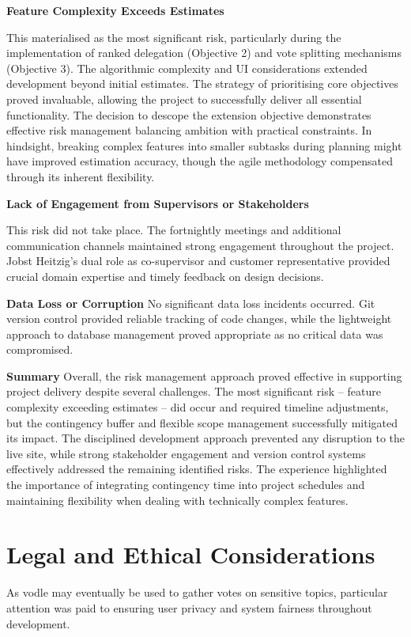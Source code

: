 \textbf{Feature Complexity Exceeds Estimates}

This materialised as the most significant risk, particularly during the implementation of ranked delegation (Objective 2) and vote splitting mechanisms (Objective 3). The algorithmic complexity and UI considerations extended development beyond initial estimates.
The strategy of prioritising core objectives proved invaluable, allowing the project to successfully deliver all essential functionality. The decision to descope the extension objective demonstrates effective risk management balancing ambition with practical constraints.
In hindsight, breaking complex features into smaller subtasks during planning might have improved estimation accuracy, though the agile methodology compensated through its inherent flexibility.

\textbf{Lack of Engagement from Supervisors or Stakeholders}

This risk did not take place. The fortnightly meetings and additional communication channels maintained strong engagement throughout the project. Jobst Heitzig's dual role as co-supervisor and customer representative provided crucial domain expertise and timely feedback on design decisions.

\textbf{Data Loss or Corruption}
No significant data loss incidents occurred. Git version control provided reliable tracking of code changes, while the lightweight approach to database management proved appropriate as no critical data was compromised.

\textbf{Summary}
Overall, the risk management approach proved effective in supporting project delivery despite several challenges. The most significant risk -- feature complexity exceeding estimates -- did occur and required timeline adjustments, but the contingency buffer and flexible scope management successfully mitigated its impact. The disciplined development approach prevented any disruption to the live site, while strong stakeholder engagement and version control systems effectively addressed the remaining identified risks. The experience highlighted the importance of integrating contingency time into project schedules and maintaining flexibility when dealing with technically complex features.

\section{Legal and Ethical Considerations}
As vodle may eventually be used to gather votes on sensitive topics, particular attention was paid to ensuring user privacy and system fairness throughout development.

